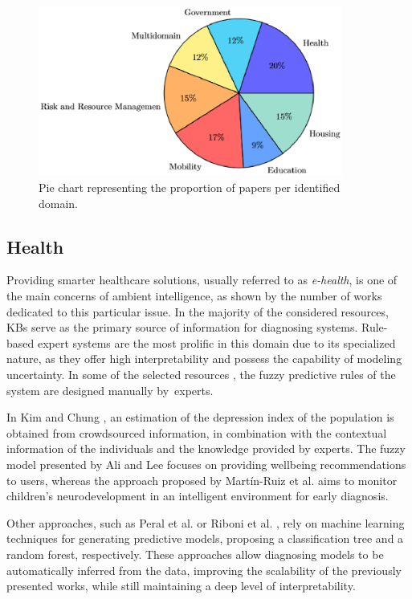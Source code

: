 \begin{figure}[H]
\centering
\includegraphics[width=10cm]{2_stateoftheart/figures/canvas.eps}
\caption{Pie chart representing the proportion of papers per identified domain. \label{fig:domains}}
\end{figure}   

\subsection{Health}
Providing smarter healthcare solutions, usually referred to as \textit{e-health}, is one of the main concerns of ambient intelligence, as shown by the number of works dedicated to this particular issue. In the majority of the considered resources, KBs serve as the primary source of information for diagnosing systems. Rule-based expert systems are the most prolific in this domain due to its specialized nature, as they offer high interpretability and possess the capability of modeling uncertainty. In some of the selected resources \citep{aliandlee,Martinruizetal,KimandChang}, the fuzzy predictive rules of the system are designed manually by~experts. 

In Kim and Chung \citep{KimandChang}, an estimation of the depression index of the population is obtained from crowdsourced information, in combination with the contextual information of the individuals and the knowledge provided by experts. The fuzzy model presented by Ali and Lee \citep{aliandlee} focuses on providing wellbeing recommendations to users, whereas the approach proposed by Martín-Ruiz et al. \citep{Martinruizetal} aims to monitor children's neurodevelopment in an intelligent environment for early diagnosis.

Other approaches, such as Peral et al. \citep{peraletal} or Riboni et al. \citep{ribonietal}, rely on machine learning techniques for generating predictive models, proposing a classification tree and a random forest, respectively. These approaches allow diagnosing models to be automatically inferred from the data, improving the scalability of the previously presented works, while still maintaining a deep level of interpretability. 

